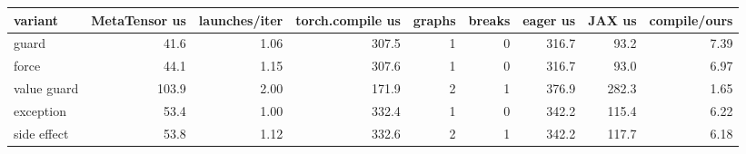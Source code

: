 \begin{tabular}{lrrrrrrrr}
\toprule
variant & MetaTensor us & launches/iter & torch.compile us & graphs & breaks & eager us & JAX us & compile/ours \\
\midrule
guard & 41.6 & 1.06 & 307.5 & 1 & 0 & 316.7 & 93.2 & 7.39 \\
force & 44.1 & 1.15 & 307.6 & 1 & 0 & 316.7 & 93.0 & 6.97 \\
value guard & 103.9 & 2.00 & 171.9 & 2 & 1 & 376.9 & 282.3 & 1.65 \\
exception & 53.4 & 1.00 & 332.4 & 1 & 0 & 342.2 & 115.4 & 6.22 \\
side effect & 53.8 & 1.12 & 332.6 & 2 & 1 & 342.2 & 117.7 & 6.18 \\
\bottomrule
\end{tabular}
